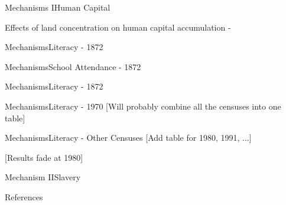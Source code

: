 \documentclass[aspectratio=1610]{beamer}
\begin{document}
\begin{frame}{Mechanisms I}{Human Capital}
    \begin{outline}
        \1 Effects of land concentration on human capital accumulation - \parencite{Galor2009-bc}  
           
    \end{outline}
\end{frame}

\begin{frame}{Mechanisms}{Literacy - 1872}
    \footnotesize
    
\end{frame}

\begin{frame}{Mechanisms}{School Attendance - 1872}
    \tiny
    
\end{frame}

\begin{frame}{Mechanisms}{Literacy - 1872}
    \footnotesize
    
\end{frame}

\begin{frame}{Mechanisms}{Literacy - 1970}
    [Will probably combine all the censuses into one table]
    \footnotesize
    
\end{frame}

\begin{frame}{Mechanisms}{Literacy - Other Censuses}
    [Add table for 1980, 1991, ...]

    [Results fade at 1980]
\end{frame}

\begin{frame}{Mechanism II}{Slavery}
    \centering
    \footnotesize
    
\end{frame}

\begin{frame}{References}
    \printbibliography
\end{frame}

\appendix
\end{document}
